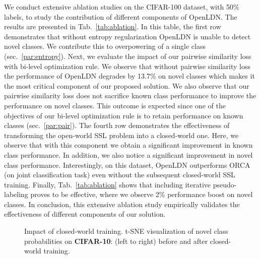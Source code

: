 \documentclass[runningheads]{eccv2022submission}
\begin{document}
We conduct extensive ablation studies on the CIFAR-100 dataset, with 50\% labels, to study the contribution of different components of OpenLDN. The results are presented in Tab.~\ref{tab:ablation}. In this table, the first row demonstrates that without entropy regularization OpenLDN is unable to detect novel classes. We contribute this to overpowering of a single class (sec.~\ref{par:entropy}). Next, we evaluate the impact of our pairwise similarity loss with bi-level optimization rule. We observe that without pairwise similarity loss the performance of OpenLDN degrades by 13.7\% on novel classes which makes it the most critical component of our proposed solution. We also observe that our pairwise similarity loss does not sacrifice known class performance to improve the performance on novel classes. This outcome is expected since one of the objectives of our bi-level optimization rule is to retain performance on known classes (sec.~\ref{par:pair}). The fourth row demonstrates the effectiveness of transforming the open-world SSL problem into a closed-world one. Here, we observe that with this component we obtain a significant improvement in known class performance. In addition, we also notice a significant improvement in novel class performance. Interestingly, on this dataset, OpenLDN outperforms ORCA~\cite{cao2022openworld} (on joint classification task) even without the subsequent closed-world SSL training. Finally, Tab.~\ref{tab:ablation} shows that including iterative pseudo-labeling proves to be effective, where we observe 2\% performance boost on novel classes. In conclusion, this extensive ablation study empirically validates the effectiveness of different components of our solution.   

\begin{figure}[t]
\captionsetup[subfloat]{labelformat=empty}
\vspace{-2mm}
    \centering
    \qquad


    \vspace{-6mm}
    \caption{\small Impact of closed-world training. t-SNE visualization of novel class probabilities on \textbf{CIFAR-10}: (left to right) before and after closed-world training.  
}
    \label{fig:tsne}\vspace{-6mm}
\end{figure}
\end{document}
